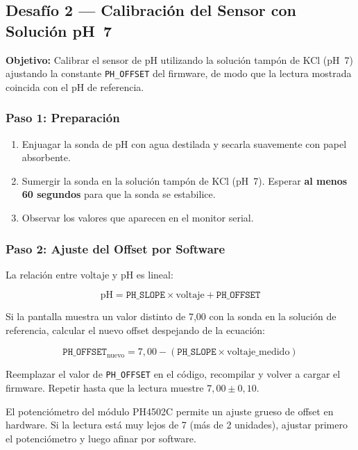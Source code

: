 \documentclass[12pt,leqno]{article}
\begin{document}
\subsection{Desaf\'io 2 --- Calibraci\'on del Sensor con Soluci\'on pH~7}

\textbf{Objetivo:} Calibrar el sensor de pH utilizando la soluci\'on tamp\'on de
KCl (pH~7) ajustando la constante \texttt{PH\_OFFSET} del firmware, de modo que
la lectura mostrada coincida con el pH de referencia.

\subsubsection*{Paso 1: Preparaci\'on}

\begin{enumerate}[(1)]
    \item Enjuagar la sonda de pH con agua destilada y secarla suavemente con papel
    absorbente.
    \item Sumergir la sonda en la soluci\'on tamp\'on de KCl (pH~7). Esperar
    \textbf{al menos 60 segundos} para que la sonda se estabilice.
    \item Observar los valores que aparecen en el monitor serial.
\end{enumerate}

\subsubsection*{Paso 2: Ajuste del Offset por Software}

La relaci\'on entre voltaje y pH es lineal:

\[
  \mathrm{pH} = \mathtt{PH\_SLOPE} \times \mathrm{voltaje} + \mathtt{PH\_OFFSET}
\]

Si la pantalla muestra un valor distinto de 7,00 con la sonda en la soluci\'on de
referencia, calcular el nuevo offset despejando de la ecuaci\'on:

\[
  \mathtt{PH\_OFFSET}_{\mathrm{nuevo}}
    = 7{,}00 - \left(\mathtt{PH\_SLOPE} \times \mathrm{voltaje\_medido}\right)
\]

Reemplazar el valor de \texttt{PH\_OFFSET} en el c\'odigo, recompilar y volver a
cargar el firmware. Repetir hasta que la lectura muestre $7{,}00 \pm 0{,}10$.

\begin{notabox}
El potenci\'ometro del m\'odulo PH4502C permite un ajuste grueso de offset en
hardware. Si la lectura est\'a muy lejos de 7 (m\'as de 2 unidades), ajustar
primero el potenci\'ometro y luego afinar por software.
\end{notabox}
\end{document}
